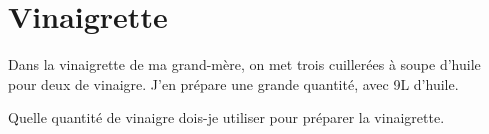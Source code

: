 \section{Vinaigrette}

Dans la vinaigrette de ma grand-mère, on met trois cuillerées à soupe d'huile pour deux de vinaigre. J'en prépare une grande quantité, avec 9L d'huile.

\begin{questions}
	\question Quelle quantité de vinaigre dois-je utiliser pour préparer la vinaigrette.
\end{questions}
